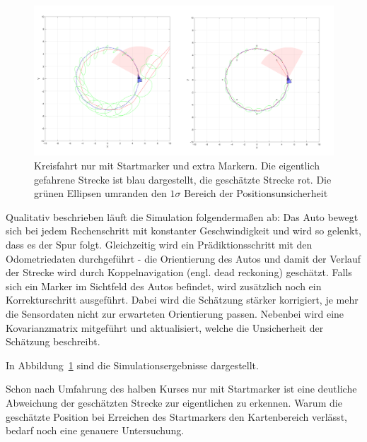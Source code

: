 \begin{figure}[H]
	\centering
    \includegraphics[width=.75\linewidth]{Figures/2.png}
	\caption{Kreisfahrt nur mit Startmarker und extra Markern. Die eigentlich gefahrene Strecke ist blau dargestellt, die geschätzte Strecke rot. Die grünen Ellipsen umranden den $1\sigma$ Bereich der Positionsunsicherheit}
	\label{fig:simulation}
\end{figure}


Qualitativ beschrieben läuft die Simulation folgendermaßen ab:
Das Auto bewegt sich bei jedem Rechenschritt mit konstanter Geschwindigkeit und wird so gelenkt, dass es der Spur folgt. Gleichzeitig wird ein Prädiktionsschritt mit den Odometriedaten durchgeführt - die Orientierung des Autos und damit der Verlauf der Strecke wird durch Koppelnavigation (engl. dead reckoning) geschätzt.
Falls sich ein Marker im Sichtfeld des Autos befindet, wird zusätzlich noch ein Korrekturschritt ausgeführt. Dabei wird die Schätzung stärker korrigiert, je mehr die Sensordaten nicht zur erwarteten Orientierung passen. Nebenbei wird eine Kovarianzmatrix mitgeführt und aktualisiert, welche die Unsicherheit der Schätzung beschreibt.

In Abbildung~\ref{fig:simulation} sind die Simulationsergebnisse dargestellt.


Schon nach Umfahrung des halben Kurses nur mit Startmarker ist eine deutliche Abweichung der geschätzten Strecke zur eigentlichen zu erkennen. Warum die geschätzte Position bei Erreichen des Startmarkers den Kartenbereich verlässt, bedarf noch eine genauere Untersuchung.